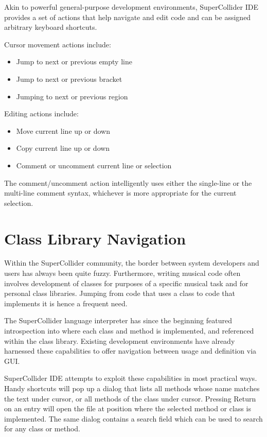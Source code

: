 \documentclass[11pt,a4paper]{article}
\begin{document}
Akin to powerful general-purpose development environments, SuperCollider IDE provides a set of actions that help
navigate and edit code and can be assigned arbitrary keyboard shortcuts.

Cursor movement actions include:
\begin{itemize}
  \item Jump to next or previous empty line
  \item Jump to next or previous bracket
  \item Jumping to next or previous region
\end{itemize}

Editing actions include:
\begin{itemize}
 \item Move current line up or down
 \item Copy current line up or down
 \item Comment or uncomment current line or selection
\end{itemize}

The comment/uncomment action intelligently uses either the single-line or the multi-line comment syntax,
whichever is more appropriate for the current selection.

\section{Class Library Navigation}
\label{class-lib-lookup}

Within the SuperCollider community, the border between system developers and users has always been
quite fuzzy. Furthermore, writing musical code often involves development of classes for purposes of
a specific musical task and for personal class libraries. Jumping from code that uses a class to
code that implements it is hence a frequent need.

The SuperCollider language interpreter has since the beginning featured introspection into where
each class and method is implemented, and referenced within the class library. Existing development
environments have already harnessed these capabilities to offer navigation between usage and
definition via GUI.

SuperCollider IDE attempts to exploit these capabilities in most practical ways. Handy shortcuts
will pop up a dialog that lists all methods whose name matches the text under cursor, or all methods
of the class under cursor. Pressing Return on an entry will open the file at position where the
selected method or class is implemented. The same dialog contains a search field which can be used
to search for any class or method.
\end{document}
